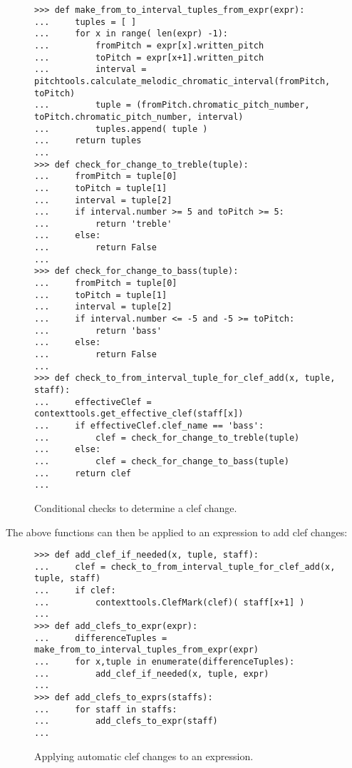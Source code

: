 \begin{figure}[H]
\begin{lstlisting}[basicstyle=\scriptsize\ttfamily, breaklines=True, tabsize=4, showtabs=false, showspaces=false]
>>> def make_from_to_interval_tuples_from_expr(expr):
...     tuples = [ ]
...     for x in range( len(expr) -1):
...         fromPitch = expr[x].written_pitch
...         toPitch = expr[x+1].written_pitch
...         interval = pitchtools.calculate_melodic_chromatic_interval(fromPitch, toPitch)
...         tuple = (fromPitch.chromatic_pitch_number, toPitch.chromatic_pitch_number, interval)
...         tuples.append( tuple )
...     return tuples
... 
>>> def check_for_change_to_treble(tuple):
...     fromPitch = tuple[0]
...     toPitch = tuple[1]
...     interval = tuple[2]
...     if interval.number >= 5 and toPitch >= 5:
...         return 'treble'
...     else:
...         return False
... 
>>> def check_for_change_to_bass(tuple):
...     fromPitch = tuple[0]
...     toPitch = tuple[1]
...     interval = tuple[2]
...     if interval.number <= -5 and -5 >= toPitch:
...         return 'bass'
...     else:
...         return False
... 
>>> def check_to_from_interval_tuple_for_clef_add(x, tuple, staff):
...     effectiveClef = contexttools.get_effective_clef(staff[x])
...     if effectiveClef.clef_name == 'bass':
...         clef = check_for_change_to_treble(tuple)
...     else:
...         clef = check_for_change_to_bass(tuple)
...     return clef
... \end{lstlisting}

\caption{Conditional checks to determine a clef change. } 
\end{figure}

The above functions can then be applied to an expression to add clef changes:

\begin{figure}[H]
\begin{lstlisting}[basicstyle=\scriptsize\ttfamily, breaklines=True, tabsize=4, showtabs=false, showspaces=false]
>>> def add_clef_if_needed(x, tuple, staff):
...     clef = check_to_from_interval_tuple_for_clef_add(x, tuple, staff) 
...     if clef:
...         contexttools.ClefMark(clef)( staff[x+1] )
... 
>>> def add_clefs_to_expr(expr):
...     differenceTuples = make_from_to_interval_tuples_from_expr(expr) 
...     for x,tuple in enumerate(differenceTuples):
...         add_clef_if_needed(x, tuple, expr)
... 
>>> def add_clefs_to_exprs(staffs):
...     for staff in staffs:
...         add_clefs_to_expr(staff)
... \end{lstlisting}

\caption{Applying automatic clef changes to an expression. } 
\end{figure}


